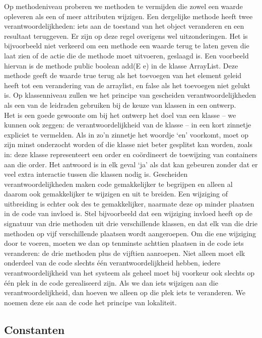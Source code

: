 \documentclass{article}
\begin{document}
	Op methodeniveau proberen we methoden te vermijden die zowel een waarde opleveren als een of meer attributen wijzigen. Een dergelijke methode heeft twee verantwoordelijkheden: iets aan de toestand van het	object veranderen en een resultaat teruggeven.
	Er zijn op deze regel overigens wel uitzonderingen. Het is bijvoorbeeld	niet verkeerd om een methode een waarde terug te laten geven die laat zien of de actie die de methode moet uitvoeren, geslaagd is. Een voorbeeld hiervan is de methode public boolean add(E e) in de klasse ArrayList. Deze methode geeft de waarde true terug als het toevoegen van het element geleid heeft tot een verandering van de arraylist, en false als het toevoegen niet gelukt is. Op klassenniveau zullen we het principe van gescheiden verantwoordelijkheden als een van de leidraden gebruiken bij de keuze van klassen in een ontwerp. \\ 
	Het is een goede gewoonte om bij het ontwerp het doel van een klasse – we kunnen ook zeggen: de verantwoordelijkheid van de klasse – in een kort zinnetje expliciet te vermelden. Als in zo’n zinnetje het woordje ‘en’ voorkomt, moet op zijn minst onderzocht worden of die klasse niet beter gesplitst kan worden, zoals in: deze klasse representeert een order en co\"{o}rdineert de toewijzing van containers aan die order. Het antwoord is in elk geval ‘ja’ als dat kan gebeuren zonder dat er veel extra interactie tussen die klassen nodig is. Gescheiden verantwoordelijkheden maken code gemakkelijker te begrijpen en alleen al daarom ook gemakkelijker te wijzigen en uit te breiden. Een wijziging of uitbreiding is echter ook des te gemakkelijker, naarmate deze op minder plaatsen in de code van invloed is. Stel bijvoorbeeld dat een wijziging invloed heeft op de signatuur van drie methoden uit drie verschillende klassen, en dat elk van die drie methoden op vijf verschillende plaatsen wordt aangeroepen. Om die ene wijziging door te voeren, moeten we dan op tenminste achttien plaatsen in de code iets veranderen: de drie methoden plus de vijftien aanroepen. Niet alleen moet elk onderdeel van de code slechts \'{e}\'{e}n verantwoordelijkheid hebben, iedere verantwoordelijkheid van het systeem als geheel moet bij voorkeur ook slechts op één plek in de code gerealiseerd zijn. Als we dan iets wijzigen aan die verantwoordelijkheid, dan hoeven we alleen op die plek iets te veranderen. We noemen deze eis aan de code het principe van lokaliteit.
	
	\subsection{Constanten}
	
\end{document}
